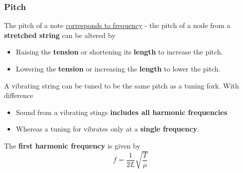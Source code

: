 \subsubsection*{Pitch}

The pitch of a note \underline{corresponds to frequency} - the pitch of a node from a \textbf{stretched string} can be altered by
\begin{itemize}
    \item Raising the \textbf{tension} or shortening its \textbf{length} to increase the pitch.
    \item Lowering the \textbf{tension} or increasing the \textbf{length} to lower the pitch.
\end{itemize}

A vibrating string can be tuned to be the same pitch as a tuning fork. With difference
\begin{itemize}
    \item Sound from a vibrating stings \textbf{includes all harmonic frequencies}
    \item Whereas a tuning for vibrates only at a \textbf{single frequency}.
\end{itemize}

The \textbf{first harmonic frequency} is given by
$$f=\frac{1}{2L}\sqrt{\frac{T}{\mu}}$$
